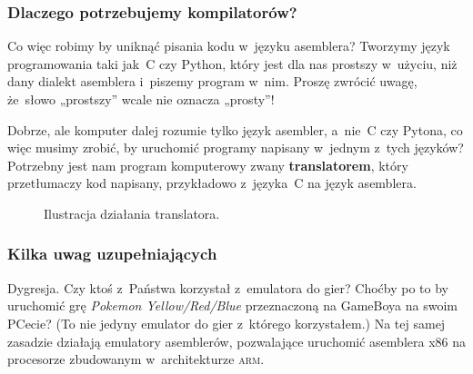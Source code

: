 \documentclass[10pt,t]{beamer}
\begin{document}
\begin{frame}
  \frametitle{Dlaczego potrzebujemy kompilatorów?}


  Co więc robimy by uniknąć pisania kodu w~języku asemblera? Tworzymy
  język programowania taki jak~C czy Python, który jest dla nas prostszy
  w~użyciu, niż dany dialekt asemblera i~piszemy program w~nim. Proszę
  zwrócić uwagę, że~słowo „prostszy” wcale nie oznacza \alert{„prosty”}!

  Dobrze, ale komputer dalej rozumie tylko język asembler, a~nie~C czy
  Pytona, co więc musimy zrobić, by uruchomić programy napisany w~jednym
  z~tych języków? Potrzebny jest nam program komputerowy zwany
  \textbf{translatorem}, który \alert{przetłumaczy} kod napisany,
  przykładowo z~języka~C na język asemblera.





  \begin{figure}

    \label{fig:Translator-01}


    \caption{Ilustracja działania translatora.}


  \end{figure}

\end{frame}





\begin{frame}
  \frametitle{Kilka uwag uzupełniających}


  \alert{Dygresja.} Czy ktoś z~Państwa korzystał z~emulatora do gier?
  Choćby po to by uruchomić grę \textit{Pokemon Yellow/Red/Blue}
  przeznaczoną na GameBoya na swoim PCecie? (To nie jedyny emulator do gier
  z~którego korzystałem.) Na tej samej zasadzie działają emulatory
  asemblerów, pozwalające uruchomić asemblera x86 na procesorze
  zbudowanym w~architekturze \textsc{arm}.

\end{frame}
\end{document}
